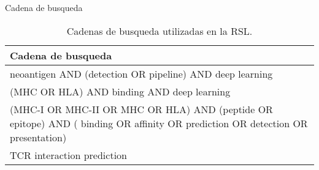 \documentclass[10pt]{beamer}
\newcommand{\1}{
	\setbeamertemplate{background}{
		\texttt{[image: img/1]}
		\tikz[overlay] \fill[fill opacity=0.75,fill=white] (0,0) rectangle (-\paperwidth,\paperheight);
	}
}
\begin{document}
\begin{frame}{Cadena de busqueda}{}
	
	\begin{table}[H]
		\begin{center}
			\caption{Cadenas de busqueda utilizadas en la RSL.}
			\label{tab:key_words}
			\setlength{\tabcolsep}{0.5em} %
			{\renewcommand{\arraystretch}{1.4}%
				\begin{tabular}{p{10cm}}
					\textbf{Cadena de busqueda} \\ \hline
					neoantigen  AND (detection OR pipeline) AND deep learning                                                                               \\
					(MHC OR HLA) AND binding  AND deep learning                                                                                             \\				
					(MHC-I OR MHC-II OR MHC OR HLA) AND (peptide OR epitope) AND ( binding OR affinity OR prediction OR detection OR presentation)          \\
					TCR interaction prediction                                                                                                              \\		
				\end{tabular}
			}
		\end{center}
	\end{table}
\end{frame}
\end{document}
